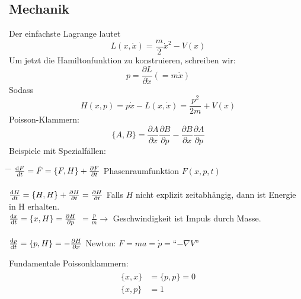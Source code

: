 	\subsection{Mechanik}
		Der einfachste Lagrange lautet 
			\begin{equation*}
				L (x,\dot{x}) = \frac{m}{2} \dot{x}^2 - V(x) 
			\end{equation*}
		Um jetzt die Hamiltonfunktion zu konstruieren, schreiben wir:
			\begin{equation*}
				p=
				\frac{\partial L}{\partial \dot{x}}
				(=m \dot{x})
			\end{equation*}
		Sodass
			\begin{equation*}
				H(x,p)= 
				p \dot{x} - L(x,\dot{x}) = 
				\frac{p^2}{2m} + V(x)
			\end{equation*}
		Poisson-Klammern:
			\begin{equation*}
				\{A,B\}=
				\frac{\partial A}{\partial x} \frac{\partial B}{\partial p}
				- \frac{\partial B}{\partial x} \frac{\partial A}{\partial p}
			\end{equation*}
		Beispiele mit Spezialfällen:
		\begin{tabbing}
			\hspace{0.4\linewidth} \= \hspace{0.6\linewidth} \= \hfill \kill
			$\frac{\mathrm{d} F}{dt} = \dot{F} = \{F,H\} + \frac{\partial F}{\partial t}$ \> 
			Phasenraumfunktion $F(x,p,t)$ \\ \\
			$\frac{\mathrm{d} H}{dt} = \{H,H\} + \frac{\partial H}{\partial t} = \frac{\partial H}{\partial t}$ \>
			Falls $H$ nicht explizit zeitabhängig, dann ist Energie \\
			\hfill \>  in H erhalten. \\  %
			$\frac{\mathrm{d} x}{\mathrm{d} t} = \{x,H\} = \frac{\partial H}{\partial p}$ \>
			$=\frac{p}{m} \rightarrow$ Geschwindigkeit ist Impuls durch Masse. \\ \\
			$\frac{\mathrm{d} p}{\mathrm{d} t} = \{p,H\} = -\frac{\partial H}{\partial x}$ \>
			Newton: $F= ma= \dot{p} =$``$- \nabla V$''	
		\end{tabbing}
		Fundamentale Poissonklammern:
			\begin{align*}
				\begin{split}
					\{x,x\} &=\{p,p\}= 0 \\
					\{x,p\} &= 1
				\end{split}
			\end{align*}